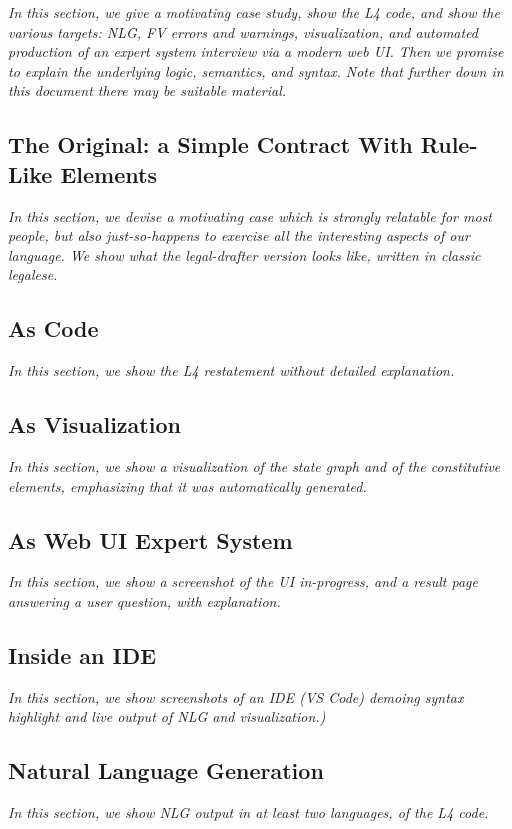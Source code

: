 \documentclass{IOS-Book-Article}
\begin{document}
\textit{In this section, we give a motivating case study, show the L4 code, and show the various targets: NLG, FV errors and warnings, visualization, and automated production of an expert system interview via a modern web UI. Then we promise to explain the underlying logic, semantics, and syntax. Note that further down in this document there may be suitable material.}

\subsection{The Original: a Simple Contract With Rule-Like Elements}

\textit{In this section, we devise a motivating case which is strongly relatable for most people, but also just-so-happens to exercise all the interesting aspects of our language. We show what the legal-drafter version looks like, written in classic legalese.}

\subsection{As Code}
\textit{In this section, we show the L4 restatement without detailed explanation.}

\subsection{As Visualization}
\textit{In this section, we show a visualization of the state graph and of the constitutive elements, emphasizing that it was automatically generated.}

\subsection{As Web UI Expert System}
\textit{In this section, we show a screenshot of the UI in-progress, and a result page answering a user question, with explanation.}

\subsection{Inside an IDE}
\textit{In this section, we show screenshots of an IDE (VS Code) demoing syntax highlight and live output of NLG and visualization.)}

\subsection{Natural Language Generation}
\textit{In this section, we show NLG output in at least two languages, of the L4 code.}
\end{document}
